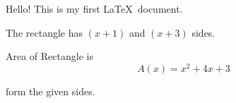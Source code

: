 \documentclass[11pt]{article}
\begin{document}
Hello! This is my first \LaTeX\ document.

The rectangle has $(x+1)$ and $(x+3)$ sides.

Area of Rectangle is $${A(x) = x^2+4x+3}$$

 form the given sides.
\end{document}
